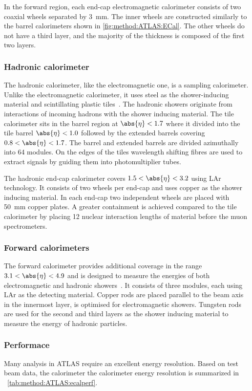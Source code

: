 In the forward region, each end-cap electromagnetic calorimeter consists of two coaxial wheels separated by \SI{3}{mm}. The inner wheels are constructed similarly to the barrel calorimeters shown in \cref{fig:method:ATLAS:ECal}. The other wheels do not have a third layer, and the majority of the thickness is composed of the first two layers. 

\subsubsection{Hadronic calorimeter}
The hadronic calorimeter, like the electromagnetic one, is a sampling calorimeter. Unlike the electromagnetic calorimeter, it uses steel as the shower-inducing material and scintillating plastic tiles~\cite{ATLAS:tile-TDR}. The hadronic showers originate from interactions of incoming hadrons with the shower inducing material. The tile calorimeter sits in the barrel region at $\abs{\eta} < 1.7$ where it divided into the tile barrel $\abs{\eta} < 1.0$ followed by the extended barrels covering $ 0.8 < \abs{\eta} < 1.7 $. The barrel and extended barrels are divided azimuthally into 64 modules. On the edges of the tiles wavelength shifting fibres are used to extract signals by guiding them into photomultiplier tubes. 

The hadronic end-cap calorimeter covers $1.5 < \abs{\eta} < 3.2$ using LAr technology. It consists of two wheels per end-cap and uses copper as the shower inducing material. In each end-cap two independent wheels are placed with \SI{50}{\milli\meter} copper plates. A greater containment is achieved compared to the tile calorimeter by placing 12 nuclear interaction lengths of material before the muon spectrometers. 

\subsubsection{Forward calorimeters}
The forward calorimeter provides additional coverage in the range $3.1 < \abs{\eta} < 4.9$ and is designed to measure the energies of both electromagnetic and hadronic showers~\cite{ATLAS:LAr-TDR}. It consists of three modules, each using LAr as the detecting material. Copper rods are placed parallel to the beam axis in the innermost layer, is optimised for electromagnetic showers. Tungsten rods are used for the second and third layers as the shower inducing material to measure the energy of hadronic particles. 

\subsubsection{Performace}
Many analysis in ATLAS require an excellent energy resolution. Based on test beam data, the calorimeter the calorimeter energy resolution is summarized in ~\cref{tab:method:ATLAS:ecalperf}.

